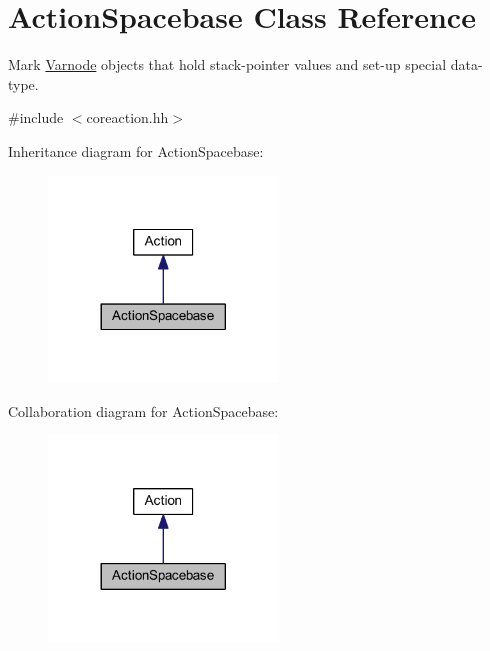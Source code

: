 \hypertarget{class_action_spacebase}{}\section{Action\+Spacebase Class Reference}
\label{class_action_spacebase}


Mark \mbox{\hyperlink{class_varnode}{Varnode}} objects that hold stack-\/pointer values and set-\/up special data-\/type.  




{\ttfamily \#include $<$coreaction.\+hh$>$}



Inheritance diagram for Action\+Spacebase\+:
\nopagebreak
\begin{figure}[H]
\begin{center}
\leavevmode
\includegraphics[width=173pt]{class_action_spacebase__inherit__graph}
\end{center}
\end{figure}


Collaboration diagram for Action\+Spacebase\+:
\nopagebreak
\begin{figure}[H]
\begin{center}
\leavevmode
\includegraphics[width=173pt]{class_action_spacebase__coll__graph}
\end{center}
\end{figure}
